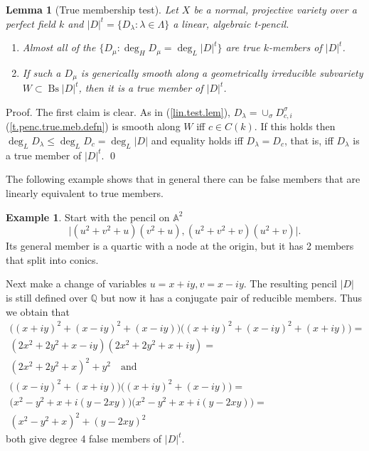 \documentclass{amsart}
\newtheorem{lem}[thm]{Lemma}
\theoremstyle{definition}
\newtheorem{exmp}[thm]{Example}
\theoremstyle{remark}
\renewcommand{\a}[0]{{\mathbb A}}
\newcommand{\q}[0]{{\mathbb Q}}
\newcommand{\qtq}[1]{\quad\mbox{#1}\quad}
\newcommand{\bs}[0]{\operatorname{Bs}}
\begin{document}
\begin{lem}[True membership test] \label{true.memb.char.lem}
Let $X$ be a normal, projective variety over a perfect field $k$ and 
$|D|^t=\{D_{\lambda}: \lambda\in \Lambda\}$ a linear,  algebraic t-pencil. 
\begin{enumerate}
\item Almost all of the  $\{ D_\mu\colon \deg_H D_{\mu}=\deg_L |D|^t\}$ are true $k$-members of $|D|^t$. 
\item  If such a $D_\mu$ is generically smooth along a geometrically irreducible subvariety  $W\subset \bs |D|^t$,   then
it is a true member of $|D|^t$.
\end{enumerate}
\end{lem}

Proof. The first claim is clear. As in  (\ref{lin.test.lem}),
$D_\lambda=\cup_{\sigma}  D_{c,i}^\sigma$  (\ref{t.penc.true.meb.defn})
is  smooth along $W$ iff $c\in C(k)$. If this holds then
$\deg_LD_\lambda\leq \deg_LD_c=\deg_L|D|$ and equality holds iff
$D_\lambda=D_c$, that is, iff $D_\lambda$ is a true member of $|D|^t$.
 \qed

\medskip

The following example shows that in general there can be false members
that are linearly equivalent to true members.

\begin{exmp} \label{non.true.emp}
Start with the pencil  on $\a^2$
$$
\bigl| (u^2+v^2+u)(v^2+u), (u^2+v^2+v)(u^2+v)\bigr|.
$$
Its general member is a quartic with a node at the origin, but it has 2 members that split into conics.

Next make a change of variables  $u=x+iy, v=x-iy$. 
The resulting pencil  $|D|$ is still defined over $\q$
but now it has  a conjugate pair of reducible members. 
Thus we obtain that
$$
\begin{array}{l}
\bigl((x+iy)^2+(x-iy)^2+(x-iy)\bigr)
\bigl((x+iy)^2+(x-iy)^2+(x+iy)\bigr)=\\
(2x^2+2y^2+x-iy)(2x^2+2y^2+x+iy)=\\
(2x^2+2y^2+x)^2+y^2\qtq{and}\\[1ex]
\bigl((x-iy)^2+(x+iy)\bigr)\bigl((x+iy)^2+(x-iy)\bigr)=\\
\bigl(x^2-y^2+x+i(y-2xy)\bigr)\bigl(x^2-y^2+x+i(y-2xy)\bigr)=\\
(x^2-y^2+x)^2+(y-2xy)^2
\end{array}
$$
both give degree 4 false members of  $|D|^t$.

\end{exmp}
\end{document}

